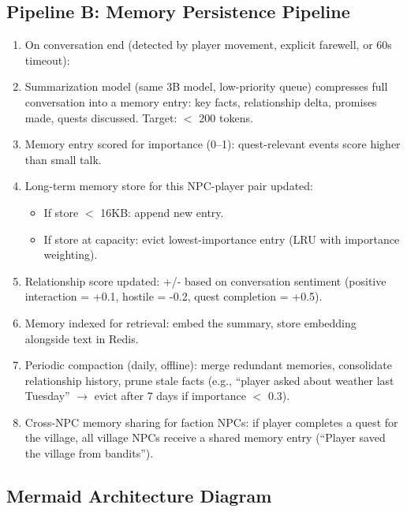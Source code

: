 \subsection*{Pipeline B: Memory Persistence Pipeline}
\begin{enumerate}
  \item On conversation end (detected by player movement, explicit farewell, or 60s timeout):
  \item Summarization model (same 3B model, low-priority queue) compresses full conversation into a memory entry: key facts, relationship delta, promises made, quests discussed. Target: $<$ 200 tokens.
  \item Memory entry scored for importance (0--1): quest-relevant events score higher than small talk.
  \item Long-term memory store for this NPC-player pair updated:
  \begin{itemize}
    \item If store $<$ 16KB: append new entry.
    \item If store at capacity: evict lowest-importance entry (LRU with importance weighting).
  \end{itemize}
  \item Relationship score updated: +/- based on conversation sentiment (positive interaction = +0.1, hostile = -0.2, quest completion = +0.5).
  \item Memory indexed for retrieval: embed the summary, store embedding alongside text in Redis.
  \item Periodic compaction (daily, offline): merge redundant memories, consolidate relationship history, prune stale facts (e.g., ``player asked about weather last Tuesday'' $\rightarrow$ evict after 7 days if importance $<$ 0.3).
  \item Cross-NPC memory sharing for faction NPCs: if player completes a quest for the village, all village NPCs receive a shared memory entry (``Player saved the village from bandits'').
\end{enumerate}

\subsection*{Mermaid Architecture Diagram}

